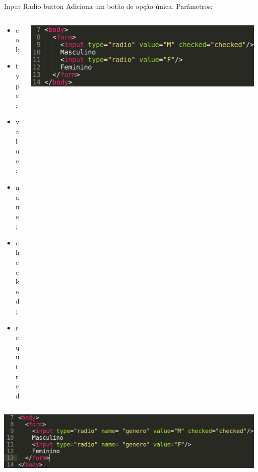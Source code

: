 \documentclass{beamer}
\begin{document}
\begin{frame}{Input Radio button}
  Adiciona um botão de opção única. Parâmetros:
    \begin{columns}
    \begin{column}{0.3 \textwidth}
      \small
     \begin{itemize}
       \item col;
        \item type;
        \item value;
        \item name;
        \item checked;
        \item required
     \end{itemize}
    \end{column}
    
    \begin{column}{0.6\textwidth}
     \includegraphics[height=0.2\paperheight]{fig/aula3/aula4_9.png}
    \end{column}
  \end{columns}
  
  \includegraphics[height=0.2\paperheight]{fig/aula3/aula4_10.png}
\end{frame}
\end{document}
